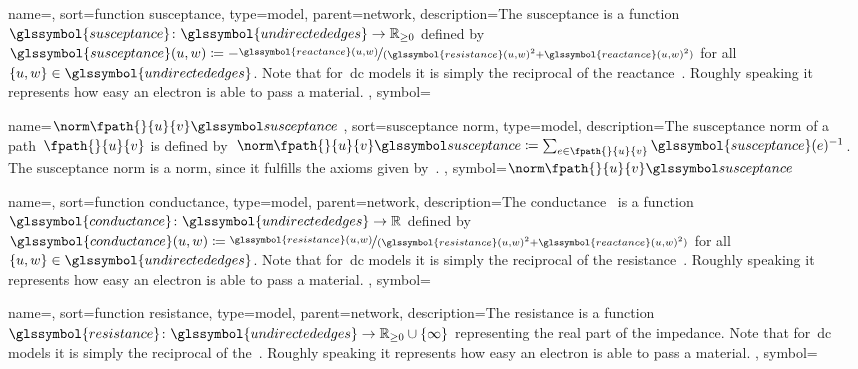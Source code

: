 {
    name={\susceptance},
    sort={function susceptance},
    type={model},
    parent={network},
    description={The susceptance is a function~$
    \glssymbol{susceptance} 
    \colon
    \glssymbol{undirectededges} 
    \to 
    \posreals$ 
    defined by~$
    \glssymbol{susceptance}(\vertexa,\vertexc)
    \coloneqq 
    -
    \nicefrac{
        \glssymbol{reactance}(\vertexa,\vertexc)
    }{
        (\glssymbol{resistance}(\vertexa,\vertexc)^2
        + 
        \glssymbol{reactance}(\vertexa,\vertexc)^2)
    }$ for all~$\{\vertexa,\vertexc\}\in\glssymbol{undirectededges}$. Note that
    for~\gls{dc} models it is simply the reciprocal of the
    reactance~. Roughly speaking it represents how easy an
    electron is able to pass a material.
    },
    symbol={\susceptance}
}

{
    name={\ensuremath{ \bnorm{\fpath{}{\vertexa}{\vertexb}} } },
    sort={susceptance norm},
    type={model},
    description={The susceptance norm of a path~$
    \fpath{}{\vertexa}{\vertexb}
    $ is defined by~$
    \bnorm{\fpath{}{\vertexa}{\vertexb}}
    \coloneqq
    \sum_{\edge\in\fpath{}{\vertexa}{\vertexb}}
    \glssymbol{susceptance}(\edge)^{-1}
    $. The susceptance norm is a norm, since it fulfills the axioms given
    by~\textcite{Ban22}.
    },
    symbol={\ensuremath{ \bnorm{\fpath{}{\vertexa}{\vertexb}} } }
}

{
    name={\conductance},
    sort={function conductance},
    type={model},
    parent={network},
    description={The conductance~ is a
    function~$
    \glssymbol{conductance} 
    \colon
    \glssymbol{undirectededges} 
    \to 
    \reals
    $ defined by~$
    \glssymbol{conductance}(\vertexa,\vertexc) 
    \coloneqq 
    \nicefrac{
        \glssymbol{resistance}(\vertexa,\vertexc)
    }{  
        (\glssymbol{resistance}(\vertexa,\vertexc)^2 
        + 
        \glssymbol{reactance}(\vertexa,\vertexc)^2)
    }$ for all~$\{\vertexa,\vertexc\}\in\glssymbol{undirectededges}$. Note that
    for~\gls{dc} models it is simply the reciprocal of the
    resistance~. Roughly speaking it represents how easy
    an electron is able to pass a material.
    },
    symbol={\conductance}
}

{
    name={\resistance},
    sort={function resistance},
    type={model},
    parent={network},
    description={The resistance is a
    function~$\glssymbol{resistance}\colon
    \glssymbol{undirectededges}\to\posreals\cup\{\infty\}$ representing the real
    part of the impedance. Note that for~\gls{dc} models it is simply the
    reciprocal of the~. Roughly speaking it represents
    how easy an electron is able to pass a material.
    },
    symbol={\resistance}
}

